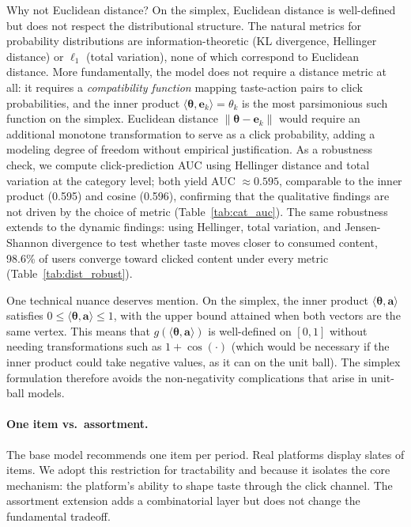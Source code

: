 \documentclass[11pt]{article}
\begin{document}
Why not Euclidean distance? On the simplex, Euclidean distance is well-defined but does not respect the distributional structure. The natural metrics for probability distributions are information-theoretic (KL divergence, Hellinger distance) or $\ell_1$ (total variation), none of which correspond to Euclidean distance. More fundamentally, the model does not require a distance metric at all: it requires a \emph{compatibility function} mapping taste-action pairs to click probabilities, and the inner product $\langle \boldsymbol{\theta}, \mathbf{e}_k \rangle = \theta_k$ is the most parsimonious such function on the simplex. Euclidean distance $\|\boldsymbol{\theta} - \mathbf{e}_k\|$ would require an additional monotone transformation to serve as a click probability, adding a modeling degree of freedom without empirical justification. As a robustness check, we compute click-prediction AUC using Hellinger distance and total variation at the category level; both yield AUC $\approx 0.595$, comparable to the inner product (0.595) and cosine (0.596), confirming that the qualitative findings are not driven by the choice of metric (Table~\ref{tab:cat_auc}). The same robustness extends to the dynamic findings: using Hellinger, total variation, and Jensen-Shannon divergence to test whether taste moves closer to consumed content, 98.6\% of users converge toward clicked content under every metric (Table~\ref{tab:dist_robust}).

One technical nuance deserves mention. On the simplex, the inner product $\langle \boldsymbol{\theta}, \mathbf{a} \rangle$ satisfies $0 \le \langle \boldsymbol{\theta}, \mathbf{a} \rangle \le 1$, with the upper bound attained when both vectors are the same vertex. This means that $g(\langle \boldsymbol{\theta}, \mathbf{a} \rangle)$ is well-defined on $[0,1]$ without needing transformations such as $1 + \cos(\cdot)$ (which would be necessary if the inner product could take negative values, as it can on the unit ball). The simplex formulation therefore avoids the non-negativity complications that arise in unit-ball models.

\paragraph{One item vs.\ assortment.} The base model recommends one item per period. Real platforms display slates of items. We adopt this restriction for tractability and because it isolates the core mechanism: the platform's ability to shape taste through the click channel. The assortment extension adds a combinatorial layer but does not change the fundamental tradeoff.
\end{document}
